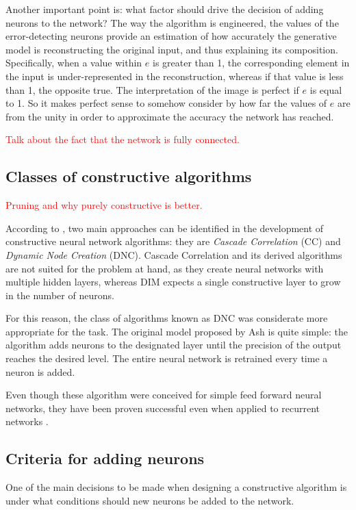 \documentclass[11pt,a4paper]{report}
\begin{document}
				Another important point is: what factor should drive the decision of adding neurons to the network? The way the algorithm is engineered, the values of the error-detecting neurons provide an estimation of how accurately the generative model is reconstructing the original input, and thus explaining its composition. Specifically, when a value within $e$ is greater than 1, the corresponding element in the input is under-represented in the reconstruction, whereas if that value is less than 1, the opposite true. The interpretation of the image is perfect if $e$ is equal to 1. So it makes perfect sense to somehow consider by how far the values of $e$ are from the unity in order to approximate the accuracy the network has reached.
			
				\textcolor{red}{Talk about the fact that the network is fully connected.}
				
			\subsection{Classes of constructive algorithms}
				
				\textcolor{red}{Pruning and why purely constructive is better.}
				
				According to \cite{fernandes2014constructive}, two main approaches can be identified in the development of constructive neural network algorithms: they are \emph{Cascade Correlation} (CC) and \emph{Dynamic Node Creation} (DNC). Cascade Correlation and its derived algorithms are not suited for the problem at hand, as they create neural networks with multiple hidden layers, whereas DIM expects a single constructive layer to grow in the number of neurons.
				
				For this reason, the class of algorithms known as DNC was considerate more appropriate for the task. The original model proposed by Ash \cite{ash1989dynamic} is quite simple: the algorithm adds neurons to the designated layer until the precision of the output reaches the desired level. The entire neural network is retrained every time a neuron is added.
				
				Even though these algorithm were conceived for simple feed forward neural networks, they have been proven successful even when applied to recurrent networks \cite{ash1989dynamic}.
				
			\subsection{Criteria for adding neurons}
				One of the main decisions to be made when designing a constructive algorithm is under what conditions should new neurons be added to the network.
				
\end{document}
